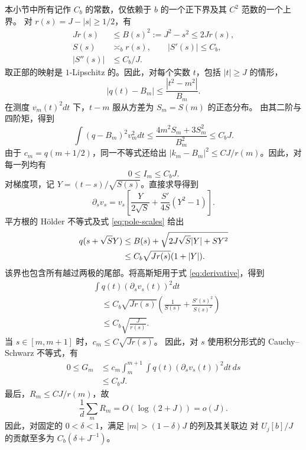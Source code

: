\documentclass[aps,pra,reprint,superscriptaddress,longbibliography]{revtex4-2}
\theoremstyle{remark}
\begin{document}
本小节中所有记作 $C_b$ 的常数，仅依赖于 $b$ 的一个正下界及其 $C^2$ 范数的一个上界。
对 $r(s)=J-|s|\geq1/2$，有
\begin{equation}
\begin{aligned}
Jr(s)&\leq B(s)^2:=J^2-s^2\leq2Jr(s),\\
S(s)&\asymp_b r(s),\qquad |S'(s)|\leq C_b,\\
|S''(s)|&\leq C_b/J.
\end{aligned}
\label{eq:pole-scales}
\end{equation}
取正部的映射是 $1$-Lipschitz 的。因此，对每个实数 $t$，包括 $|t|\geq J$ 的情形，
\begin{equation}
 |q(t)-B_m|\leq\frac{|t^2-m^2|}{B_m}.
 \label{eq:global-q}
\end{equation}
在测度 $v_m(t)^2dt$ 下，$t-m$ 服从方差为 $S_m=S(m)$ 的正态分布。
由其二阶与四阶矩，得到
\begin{equation}
 \int(q-B_m)^2v_m^2dt
 \leq\frac{4m^2S_m+3S_m^2}{B_m^2}\leq C_bJ.
 \label{eq:position-bound}
\end{equation}
由于 $c_m=q(m+1/2)$，同一不等式还给出 $|k_m-B_m|^2\leq CJ/r(m)$。因此，对每一列均有
\begin{equation}
 0\leq I_m\leq C_bJ.
 \label{eq:I-bound}
\end{equation}
对梯度项，记 $Y=(t-s)/\sqrt{S(s)}$。直接求导得到
\begin{equation}
 \partial_sv_s=v_s\left[\frac{Y}{2\sqrt S}
 +\frac{S'}{4S}(Y^2-1)\right].
 \label{eq:derivative}
\end{equation}
平方根的 H\"older 不等式及式 \eqref{eq:pole-scales} 给出
\begin{align}
 q(s+\sqrt S Y)
 &\leq B(s)+\sqrt{2J\sqrt S|Y|+SY^2}\notag\\
 &\leq C_b\sqrt{Jr(s)}(1+|Y|).
 \label{eq:q-bound}
\end{align}
该界也包含所有越过两极的尾部。将高斯矩用于式 \eqref{eq:derivative}，得到
\begin{equation}
\begin{aligned}
&\int q(t)(\partial_sv_s(t))^2dt\\
&\quad\leq C_b\sqrt{Jr(s)}
\left(\frac1{S(s)}+\frac{S'(s)^2}{S(s)^2}\right)\\
&\quad\leq C_b\sqrt{\frac J{r(s)}}.
\end{aligned}
\label{eq:derivative-bound}
\end{equation}
当 $s\in[m,m+1]$ 时，$c_m\leq C\sqrt{Jr(s)}$。
因此，对 $s$ 使用积分形式的 Cauchy--Schwarz 不等式，有
\begin{equation}
\begin{aligned}
0\leq G_m
&\leq c_m\int_m^{m+1}\int q(t)(\partial_sv_s(t))^2dt\,ds\\
&\leq C_bJ.
\end{aligned}
\label{eq:G-bound}
\end{equation}
最后，$R_m\leq CJ/r(m)$，故
\begin{equation}
 \frac1d\sum_mR_m=O(\log(2+J))=o(J).
 \label{eq:R-bound}
\end{equation}
因此，对固定的 $0<\delta<1$，满足 $|m|>(1-\delta)J$ 的列及其关联边
对 $U_j[b]/J$ 的贡献至多为 $C_b(\delta+J^{-1})$。
\end{document}
